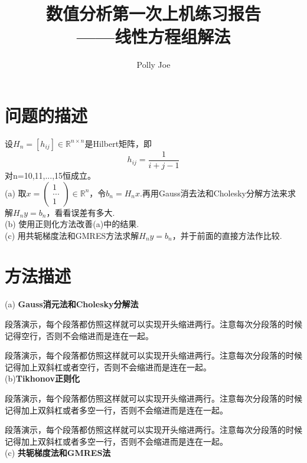 \documentclass[UTF8,twoside,zihao=-4,AutoFakeBold,scheme=chinese,openany]{ctexart}
\title{\textbf{\Large\kaishu 数值分析第一次上机练习报告\\ \large\kaishu ——线性方程组解法}}
\author{\normalsize\kaishu Polly Joe}
\date{}
\begin{document}
\maketitle


\section{问题的描述}
设$H_n=[h_{ij}] \in \mathbb{R}^{n \times n}$是Hilbert矩阵，即
$$h_{ij}=\frac{1}{i+j-1}$$
对n=10,11,...,15恒成立。\\
(a) 取$x=
        \begin{pmatrix}
         1  \\
         ...\\
         1
    \end{pmatrix}\in \mathbb{R}^{n}$，令$b_n=H_nx$.再用Gauss消去法和Cholesky分解方法来求解$H_ny=b_n$，看看误差有多大.\\
(b) 使用正则化方法改善(a)中的结果.\\
(c) 用共轭梯度法和GMRES方法求解$H_ny=b_n$，并于前面的直接方法作比较.





\section{方法描述}
(a) \textbf{Gauss消元法和Cholesky分解法}

\setlength{\parindent}{2em}段落演示，每个段落都仿照这样就可以实现开头缩进两行。注意每次分段落的时候记得空行，否则不会缩进而是连在一起。

\setlength{\parindent}{2em}段落演示，每个段落都仿照这样就可以实现开头缩进两行。注意每次分段落的时候记得加上双斜杠或者空行，否则不会缩进而是连在一起。\\



(b)\textbf{Tikhonov正则化}

\setlength{\parindent}{2em}段落演示，每个段落都仿照这样就可以实现开头缩进两行。注意每次分段落的时候记得加上双斜杠或者多空一行，否则不会缩进而是连在一起。

\setlength{\parindent}{2em}段落演示，每个段落都仿照这样就可以实现开头缩进两行。注意每次分段落的时候记得加上双斜杠或者多空一行，否则不会缩进而是连在一起。\\

(c) \textbf{共轭梯度法和GMRES法}
\end{document}
